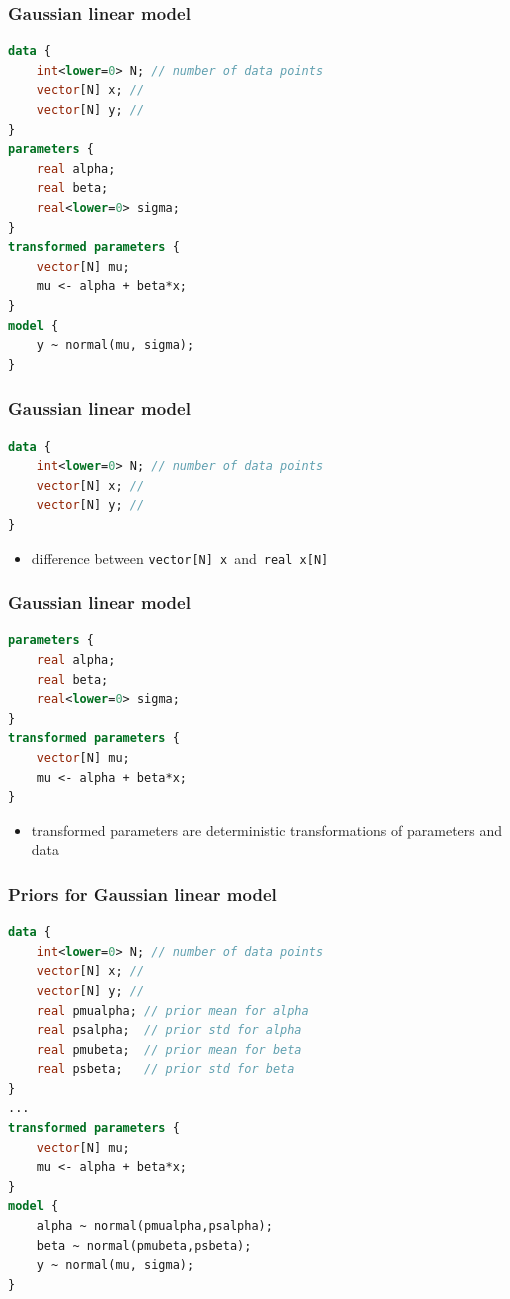 \documentclass[10pt]{beamer}
\begin{document}
\begin{frame}[fragile]

\frametitle{Gaussian linear model}
  {\small
  \begin{lstlisting}[language=Stan]
data {
    int<lower=0> N; // number of data points
    vector[N] x; //
    vector[N] y; //
}
parameters {
    real alpha;
    real beta;
    real<lower=0> sigma;
}
transformed parameters {
    vector[N] mu;
    mu <- alpha + beta*x;
}
model {
    y ~ normal(mu, sigma);
}
  \end{lstlisting}
}
\end{frame}

\begin{frame}[fragile]

\frametitle{Gaussian linear model}
  {\small
  \begin{lstlisting}[language=Stan]
data {
    int<lower=0> N; // number of data points
    vector[N] x; //
    vector[N] y; //
}
\end{lstlisting}
  }

  \begin{itemize}
  \item difference between {\tt vector[N] x}\, and\, {\tt real x[N]}
  \end{itemize}
\end{frame}

\begin{frame}[fragile]

\frametitle{Gaussian linear model}
  {\small
  \begin{lstlisting}[language=Stan]
parameters {
    real alpha;
    real beta;
    real<lower=0> sigma;
}
transformed parameters {
    vector[N] mu;
    mu <- alpha + beta*x;
}
\end{lstlisting}
  }
  \begin{itemize}
  \item transformed parameters are deterministic transformations of parameters and data
  \end{itemize}
\end{frame}

\begin{frame}[fragile]

\frametitle{Priors for Gaussian linear model}
  {\small
  \begin{lstlisting}[language=Stan]
data {
    int<lower=0> N; // number of data points
    vector[N] x; //
    vector[N] y; //
    real pmualpha; // prior mean for alpha
    real psalpha;  // prior std for alpha
    real pmubeta;  // prior mean for beta
    real psbeta;   // prior std for beta
}
...
transformed parameters {
    vector[N] mu;
    mu <- alpha + beta*x;
}
model {
    alpha ~ normal(pmualpha,psalpha);
    beta ~ normal(pmubeta,psbeta);
    y ~ normal(mu, sigma);
}
  \end{lstlisting}
}
\end{frame}
\end{document}
